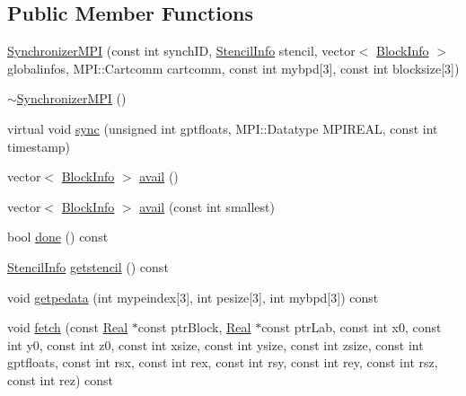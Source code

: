\subsection*{Public Member Functions}
\begin{DoxyCompactItemize}
\item 
\hyperlink{class_synchronizer_m_p_i_a361cd2e7121eec06007dedc5cae65278}{Synchronizer\+M\+P\+I} (const int synch\+I\+D, \hyperlink{struct_stencil_info}{Stencil\+Info} stencil, vector$<$ \hyperlink{struct_block_info}{Block\+Info} $>$ globalinfos, M\+P\+I\+::\+Cartcomm cartcomm, const int mybpd\mbox{[}3\mbox{]}, const int blocksize\mbox{[}3\mbox{]})
\item 
\hyperlink{class_synchronizer_m_p_i_a783e782e542e65144eda9105ae986e3b}{$\sim$\+Synchronizer\+M\+P\+I} ()
\item 
virtual void \hyperlink{class_synchronizer_m_p_i_a34c0550eac39387ac5e1d826aab3300e}{sync} (unsigned int gptfloats, M\+P\+I\+::\+Datatype M\+P\+I\+R\+E\+A\+L, const int timestamp)
\item 
vector$<$ \hyperlink{struct_block_info}{Block\+Info} $>$ \hyperlink{class_synchronizer_m_p_i_aaa3b9722374a17f0703f09b6ae8f7821}{avail} ()
\item 
vector$<$ \hyperlink{struct_block_info}{Block\+Info} $>$ \hyperlink{class_synchronizer_m_p_i_a1fe2fa97907cbae0ddc874cee4462d83}{avail} (const int smallest)
\item 
bool \hyperlink{class_synchronizer_m_p_i_aef137611a6b701c39db613c5e9c62812}{done} () const 
\item 
\hyperlink{struct_stencil_info}{Stencil\+Info} \hyperlink{class_synchronizer_m_p_i_a3ef18cbe8ce8ce18e7c96dbd09419e11}{getstencil} () const 
\item 
void \hyperlink{class_synchronizer_m_p_i_ad67473ef9e13988052feef92c4c3f086}{getpedata} (int mypeindex\mbox{[}3\mbox{]}, int pesize\mbox{[}3\mbox{]}, int mybpd\mbox{[}3\mbox{]}) const 
\item 
void \hyperlink{class_synchronizer_m_p_i_abac3624b538d4968e1953a2aee32d449}{fetch} (const \hyperlink{_h_d_f5_dumper_8h_a445a5f0e2a34c9d97d69a3c2d1957907}{Real} $\ast$const ptr\+Block, \hyperlink{_h_d_f5_dumper_8h_a445a5f0e2a34c9d97d69a3c2d1957907}{Real} $\ast$const ptr\+Lab, const int x0, const int y0, const int z0, const int xsize, const int ysize, const int zsize, const int gptfloats, const int rsx, const int rex, const int rsy, const int rey, const int rsz, const int rez) const 
\end{DoxyCompactItemize}


